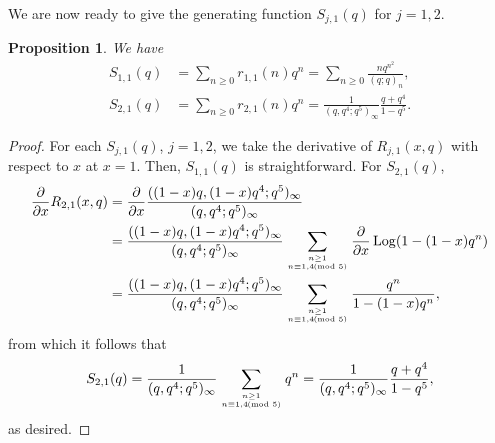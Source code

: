\documentclass[11pt,reqno]{amsart}
\newtheorem{proposition}[theorem]{Proposition}
\theoremstyle{remark}
\numberwithin{equation}{section}
\def\Log{\operatorname{Log}}
\def\Log{\operatorname{Log}}
\begin{document}
We are now ready to give the generating function $S_{j,1}(q)$ for $j=1,2$. 
\begin{proposition} \label{gen_S1}
We have
\begin{align*}
	S_{1,1}(q)&=\sum_{n\ge 0} r_{1,1}(n) q^n = \sum_{n\ge 0} \frac{ n q^{n^2} }{(q;q)_n},\\
	S_{2,1}(q)&=\sum_{n\ge 0} r_{2,1}(n) q^n = \frac{1}{(q, q^4;q^5)_{\infty}} \frac{q+q^4}{1-q^{5}}.
\end{align*}
\end{proposition}
\begin{proof}
For each $S_{j,1}(q)$, $j=1,2$, we take the derivative of $R_{j,1}(x,q)$ with respect to $x$ at $x=1$. Then,
$S_{1,1}(q)$ is straightforward. For $S_{2,1}(q)$,%
\begin{align*}
	\frac{\partial } {\partial x} R_{2,1}(x,q)&= \frac{\partial}{\partial x} \frac{((1-x)q, (1-x)q^4;q^5)_{\infty} }{(q,q^4;q^5)_{\infty}} \\
	&= \frac{((1-x)q, (1-x)q^4;q^5)_{\infty}}{(q,q^4;q^5)_{\infty}} \sum_{n\ge 1 \atop n\equiv 1,4 \!\!\!\pmod{5}} \frac{\partial}{\partial x} \Log (1-(1-x)q^n)\\
	&= \frac{((1-x)q, (1-x)q^4;q^5)_{\infty}}{(q,q^4;q^5)_{\infty}} \sum_{n\ge 1 \atop n\equiv 1,4 \!\!\!\pmod{5}} \frac{ q^n}{1-(1-x)q^n},
\end{align*}
from which it follows that
$$
S_{2,1}(q)=\frac{1}{(q,q^4;q^5)_{\infty}} \sum_{n\ge 1 \atop n \equiv 1,4 \!\!\!\pmod{5}} q^n= \frac{1}{(q,q^4;q^5)_{\infty}} \frac{q+q^4}{1-q^5}, 
$$
as desired.
\end{proof}



\end{document}
